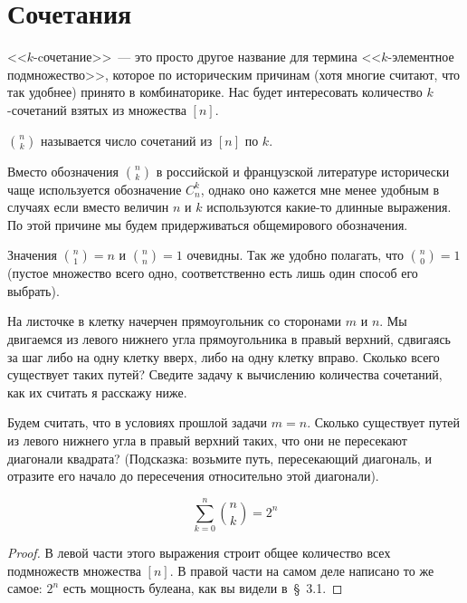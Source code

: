 \section{Сочетания}

<<$k$-cочетание>>~--- это просто другое название для термина <<$k$-элементное подмножество>>, которое по историческим причинам (хотя многие считают, что так удобнее) принято в комбинаторике. Нас будет интересовать количество $k$-сочетаний взятых из множества $[n]$.

\begin{definition}
 $n \choose k$ называется число сочетаний из $[n]$ по $k$.
\end{definition}

Вместо обозначения ${n \choose k}$ в российской и французской литературе исторически чаще используется обозначение $C^k_n$, однако оно кажется мне менее удобным в случаях если вместо величин $n$ и $k$ используются какие-то длинные выражения. По этой причине мы будем придерживаться общемирового обозначения.

Значения ${n \choose 1} = n$ и ${n \choose n} = 1$ очевидны. Так же удобно полагать, что ${n \choose 0} =1$ (пустое множество всего одно, соответственно есть лишь один способ его выбрать). 

\begin{exercise}
На листочке в клетку начерчен прямоугольник со сторонами $m$ и $n$. Мы двигаемся из левого нижнего угла прямоугольника в правый верхний, сдвигаясь за шаг либо на одну клетку вверх, либо на одну клетку вправо. Сколько всего существует таких путей? Сведите задачу к вычислению количества сочетаний, как их считать я расскажу ниже.
\end{exercise}

\begin{exercise}
Будем считать, что в условиях прошлой задачи $m=n$. Сколько существует путей из левого нижнего угла в правый верхний таких, что они не пересекают диагонали квадрата? (Подсказка: возьмите путь, пересекающий диагональ, и отразите его начало до пересечения относительно этой диагонали).
\end{exercise}

\begin{thm}
$$\sum_{k=0}^n{n \choose k} = 2^n$$
\end{thm}
\begin{proof}
В левой части этого выражения строит общее количество всех подмножеств множества $[n]$. В правой части на самом деле написано то же самое: $2^n$ есть мощность булеана, как вы видели в~\S~3.1.
\end{proof}


